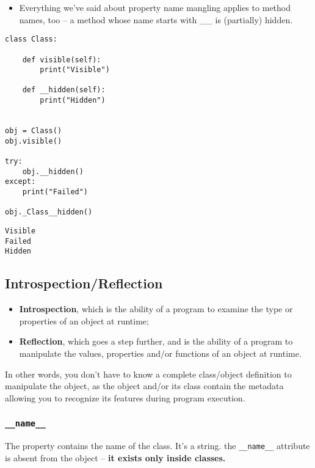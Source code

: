 \documentclass[11pt]{article}
\begin{document}
\vspace{10 mm}

\begin{itemize}
\item Everything we’ve said about property name mangling applies to method
names, too – a method whose name starts with \_\_ is (partially)
hidden.
\end{itemize}

\begin{verbatim}
class Class:

    def visible(self):
        print("Visible")

    def __hidden(self):
        print("Hidden")


obj = Class()
obj.visible()

try:
    obj.__hidden()
except:
    print("Failed")

obj._Class__hidden()

\end{verbatim}

\begin{verbatim}
Visible
Failed
Hidden
\end{verbatim}
\subsection{Introspection/Reflection}
\label{sec:org8d0aa46}
\begin{itemize}
\item \textbf{Introspection}, which is the ability of a program to examine the
type or properties of an object at runtime;
\item \textbf{Reflection}, which goes a step further, and is the ability of a
program to manipulate the values, properties and/or functions of an
object at runtime.
\end{itemize}

In other words, you don’t have to know a complete class/object
definition to manipulate the object, as the object and/or its class
contain the metadata allowing you to recognize its features during
program execution.

\subsubsection{\texttt{\_\_name\_\_}}
\label{sec:orgf5b22db}
The property contains the name of the class. It’s a string. the
\texttt{\_\_name\_\_} attribute is absent from the object – \textbf{it exists only inside
classes.}
\end{document}
